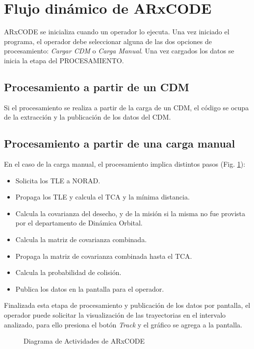 \section{Flujo din\'amico de ARxCODE}

ARxCODE se inicializa cuando un operador lo ejecuta. Una vez iniciado el programa, el operador debe seleccionar alguna de las dos opciones de procesamiento: {\it{Cargar CDM}} o {\it{Carga Manual}}. Una vez cargados los datos se inicia la etapa del PROCESAMIENTO.

\subsection*{Procesamiento a partir de un CDM}
Si el procesamiento se realiza a partir de la carga de un CDM, el c\'odigo se ocupa de la extracci\'on y la publicaci\'on de los datos del CDM. 
\subsection*{Procesamiento a partir de una carga manual}
En el caso de la carga manual, el procesamiento implica distintos pasos (Fig. \ref{fig:actdiag}):
\begin{itemize}
 \item Solicita los TLE a NORAD.
 \item Propaga los TLE y calcula el TCA y la m\'inima distancia.
 \item Calcula la covarianza del desecho, y de la misi\'on si la misma no fue provista por el departamento de Din\'amica Orbital.
 \item Calcula la matriz de covarianza combinada.
 \item Propaga la matriz de covarianza combinada hasta el TCA.
 \item Calcula la probabilidad de colisi\'on.
 \item Publica los datos en la pantalla para el operador.
\end{itemize}

Finalizada esta etapa de procesamiento y publicaci\'on de los datos por pantalla, el operador puede solicitar la visualizaci\'on de las trayectorias en el intervalo analizado, para ello presiona el bot\'on {\it{Track}} y el gr\'afico se agrega a la pantalla.\\

\begin{figure}[h!]
  \centering
  \caption{Diagrama de Actividades de ARxCODE}
  \label{fig:actdiag}
\end{figure}

